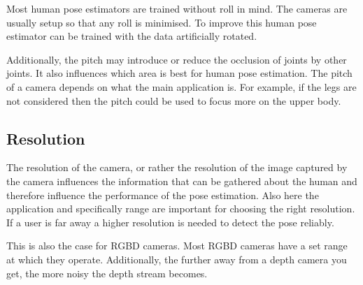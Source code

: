 Most human pose estimators are trained without roll in mind. The cameras are usually setup so that any roll is minimised. To improve this human pose estimator can be trained with the data artificially rotated.

Additionally, the pitch may introduce or reduce the occlusion of joints by other joints. It also influences which area is best for human pose estimation. The pitch of a camera depends on what the main application is. For example, if the legs are not considered then the pitch could be used to focus more on the upper body.

\subsection{Resolution}

The resolution of the camera, or rather the resolution of the image captured by the camera influences the information that can be gathered about the human and therefore influence the performance of the pose estimation. Also here the application and specifically range are important for choosing the right resolution. If a user is far away a higher resolution is needed to detect the pose reliably.

This is also the case for RGBD cameras. Most RGBD cameras have a set range at which they operate. Additionally, the further away from a depth camera you get, the more noisy the depth stream becomes.